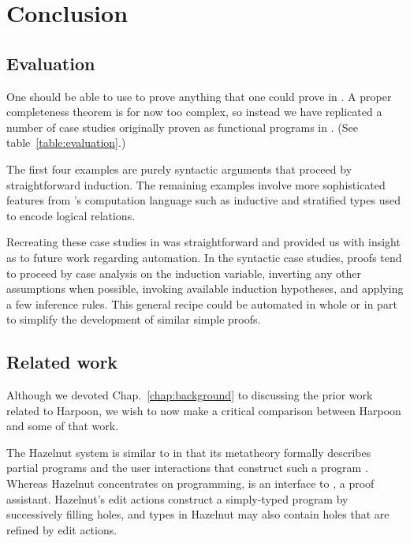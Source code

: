 \chapter{Conclusion}

\section{Evaluation}

One should be able to use \Harpoon{} to prove anything that one could prove in
\Beluga. A proper completeness theorem is for now too complex\footnotemark, so
instead we have replicated a number of case studies originally proven as
functional programs in \Beluga. (See table~\ref{table:evaluation}.)

\begin{table}[h]
  \centering
  
  \caption{%
    Summary of proofs ported to \Harpoon{} from \Beluga.
  }
  \label{table:evaluation}
\end{table}

The first four examples are purely syntactic arguments that proceed by
straightforward induction.
The remaining examples involve more sophisticated features from \Beluga's
computation language such as inductive and stratified types used to encode
logical relations.

Recreating these case studies in \Harpoon{} was straightforward and provided us
with insight as to future work regarding automation. In the syntactic case
studies, proofs tend to proceed by case analysis on the induction variable,
inverting any other assumptions when possible, invoking available induction
hypotheses, and applying a few inference rules. This general recipe could be
automated in whole or in part to simplify the development of similar simple
proofs.

\section{Related work}

Although we devoted Chap.~\ref{chap:background} to discussing the prior work
related to Harpoon, we wish to now make a critical comparison between Harpoon
and some of that work.

The Hazelnut system is similar to \Harpoon{} in that its metatheory formally
describes partial programs and the user interactions that construct such a
program \cite{hazelnut}.
Whereas Hazelnut concentrates on programming, \Harpoon{} is an interface to
\Beluga, a proof assistant. Hazelnut's edit actions construct a simply-typed
program by successively filling holes, and types in Hazelnut may also contain
holes that are refined by edit actions.


